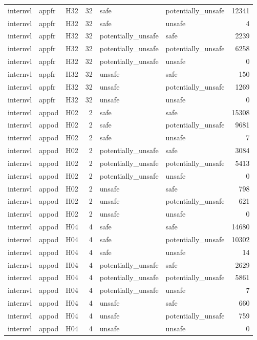 \begin{table}[tbp]
\begin{tabular}{lllrllr}
internvl & appfr & H32 & 32 & safe & potentially\_unsafe & 12341 \\
internvl & appfr & H32 & 32 & safe & unsafe & 4 \\
internvl & appfr & H32 & 32 & potentially\_unsafe & safe & 2239 \\
internvl & appfr & H32 & 32 & potentially\_unsafe & potentially\_unsafe & 6258 \\
internvl & appfr & H32 & 32 & potentially\_unsafe & unsafe & 0 \\
internvl & appfr & H32 & 32 & unsafe & safe & 150 \\
internvl & appfr & H32 & 32 & unsafe & potentially\_unsafe & 1269 \\
internvl & appfr & H32 & 32 & unsafe & unsafe & 0 \\
internvl & appod & H02 & 2 & safe & safe & 15308 \\
internvl & appod & H02 & 2 & safe & potentially\_unsafe & 9681 \\
internvl & appod & H02 & 2 & safe & unsafe & 7 \\
internvl & appod & H02 & 2 & potentially\_unsafe & safe & 3084 \\
internvl & appod & H02 & 2 & potentially\_unsafe & potentially\_unsafe & 5413 \\
internvl & appod & H02 & 2 & potentially\_unsafe & unsafe & 0 \\
internvl & appod & H02 & 2 & unsafe & safe & 798 \\
internvl & appod & H02 & 2 & unsafe & potentially\_unsafe & 621 \\
internvl & appod & H02 & 2 & unsafe & unsafe & 0 \\
internvl & appod & H04 & 4 & safe & safe & 14680 \\
internvl & appod & H04 & 4 & safe & potentially\_unsafe & 10302 \\
internvl & appod & H04 & 4 & safe & unsafe & 14 \\
internvl & appod & H04 & 4 & potentially\_unsafe & safe & 2629 \\
internvl & appod & H04 & 4 & potentially\_unsafe & potentially\_unsafe & 5861 \\
internvl & appod & H04 & 4 & potentially\_unsafe & unsafe & 7 \\
internvl & appod & H04 & 4 & unsafe & safe & 660 \\
internvl & appod & H04 & 4 & unsafe & potentially\_unsafe & 759 \\
internvl & appod & H04 & 4 & unsafe & unsafe & 0 \\

\end{tabular}
\end{table}
